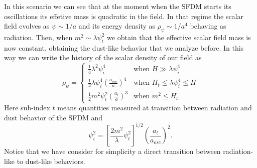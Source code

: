 \documentclass[amssymb,twocolumn,prd,nofootinbib,showpacs]{revtex4-1}
\begin{document}
\begin{itemize}
In this scenario we can see that at the moment when the SFDM starts its oscillations its effetive mass is quadratic in the field. In that regime the scalar field evolves as $\psi\sim 1/a$ and its energy density as $\rho_{\psi}\sim 1/a^4$ behaving as radiation. Then, when $m^2 \sim \lambda\psi_t^2$ we obtain that the effective scalar field mass is now constant, obtaining the dust-like behavior that we analyze before. In this way we can write the history of the scalar density of our field as
\begin{equation}\label{rhosfdmlam}
\rho_\psi = \left\lbrace\begin{array}{ll}
\frac{1}{4}\lambda^2\psi_i^4 & \text{when }H\gg \lambda\psi_i^4 \\
\frac{1}{4}\lambda\psi_i^4\left(\frac{a_{osc}}{a}\right)^4 & \text{when }H_t\leq \lambda\psi_i^4\leq H\\
\frac{1}{2}m^2\psi_t^2\left(\frac{a_t}{a}\right)^3 & \text{when } m^2\leq H_t
\end{array}\right .
\end{equation}
Here sub-index $t$ means quantities measured at transition between radiation and dust behavior of the SFDM and
\begin{equation}\label{inilamb}
\psi_i^2=\left[\frac{2m^2}{\lambda}\psi_t^2\right]^{1/2}\left(\frac{a_t}{a_{osc}}\right)^2.
\end{equation}
Notice that we have consider for simplicity a direct transition between radiation-like to dust-like behaviors. 


\end{itemize}
\end{document}
